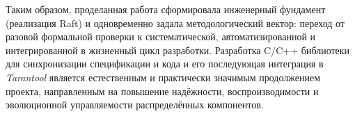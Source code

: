 Таким образом, проделанная работа сформировала инженерный фундамент (реализация
Raft) и одновременно задала методологический вектор: переход от разовой
формальной проверки к систематической, автоматизированной и интегрированной в
жизненный цикл разработки. Разработка C/C++ библиотеки для синхронизации
спецификации и кода и его последующая интеграция в \textit{Tarantool} является
естественным и практически значимым продолжением проекта, направленным на
повышение надёжности, воспроизводимости и эволюционной управляемости
распределённых компонентов.


